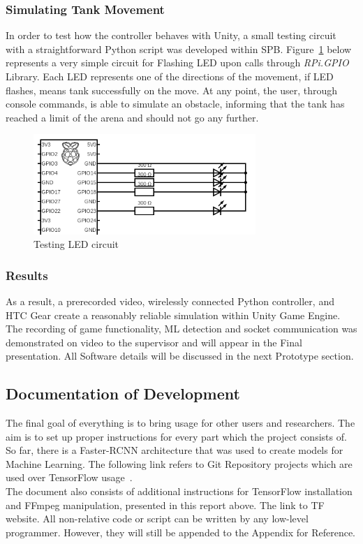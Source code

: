 \subsubsection{Simulating Tank Movement}
In order to test how the controller behaves with Unity, a small testing circuit with a straightforward Python script was developed within SPB.
Figure~\ref{fig:circuit} below represents a very simple circuit for Flashing LED upon calls through \textit{RPi.GPIO} Library.
Each LED represents one of the directions of the movement, if LED flashes, means tank successfully on the move.
At any point, the user, through console commands, is able to simulate an obstacle, informing that the tank has reached a limit of the arena and should not go any further.
\begin{figure}[H]
	\centering        
	\includegraphics[width=0.75\textwidth]{project/images/circuit-cut.PNG}
	\caption{Testing LED circuit}
	\label{fig:circuit}
\end{figure}
\subsubsection{Results}
As a result, a prerecorded video, wirelessly connected Python controller, and HTC Gear create a reasonably reliable simulation within Unity Game Engine.
The recording of game functionality, ML detection and socket communication was demonstrated on video to the supervisor and will appear in the Final presentation. 
All Software details will be discussed in the next Prototype section. 
\subsection{Documentation of Development}
The final goal of everything is to bring usage for other users and researchers.
The aim is to set up proper instructions for every part which the project consists of.
So far, there is a Faster-RCNN architecture that was used to create models for Machine Learning.
The following link refers to Git Repository projects which are used over TensorFlow usage~\cite{smugglersmr_repository_2018}.\\
The document also consists of additional instructions for TensorFlow installation and FFmpeg manipulation, presented in this report above. 
The link to TF website\cite{tensorflow_build_2019}.
All non-relative code or script can be written by any low-level programmer.
However, they will still be appended to the Appendix for Reference.
